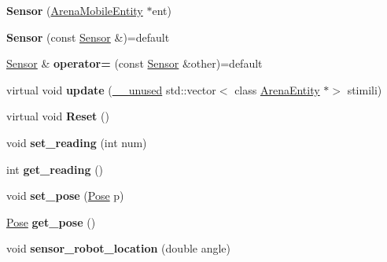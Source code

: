 \begin{DoxyCompactItemize}
\item 
\mbox{\label{class_sensor_a13c4b3a00db6e21e2ac33647440fdc37}} 
{\bfseries Sensor} (\mbox{\hyperlink{class_arena_mobile_entity}{Arena\+Mobile\+Entity}} $\ast$ent)
\item 
\mbox{\label{class_sensor_ac1d81bc5c639eeafed38d69e40dc07b8}} 
{\bfseries Sensor} (const \mbox{\hyperlink{class_sensor}{Sensor}} \&)=default
\item 
\mbox{\label{class_sensor_a48b21cd29fa3f183a2fb9e6447de2219}} 
\mbox{\hyperlink{class_sensor}{Sensor}} \& {\bfseries operator=} (const \mbox{\hyperlink{class_sensor}{Sensor}} \&other)=default
\item 
\mbox{\label{class_sensor_a2e4e8e8e56d307f83550cc04896d2518}} 
virtual void {\bfseries update} (\mbox{\hyperlink{common_8h_a2e3484535ee610c8e19e9859563abe48}{\+\_\+\+\_\+unused}} std\+::vector$<$ class \mbox{\hyperlink{class_arena_entity}{Arena\+Entity}} $\ast$$>$ stimili)
\item 
\mbox{\label{class_sensor_a5e6ad1aa7b2c48e59851e03404dacbde}} 
virtual void {\bfseries Reset} ()
\item 
\mbox{\label{class_sensor_a3ee42616cfe5e55c1efa2a4fd6761a44}} 
void {\bfseries set\+\_\+reading} (int num)
\item 
\mbox{\label{class_sensor_ae574c5b7e58bdbbc47c0d83a7561fa19}} 
int {\bfseries get\+\_\+reading} ()
\item 
\mbox{\label{class_sensor_a877b65abc60821f62fe16771923fba38}} 
void {\bfseries set\+\_\+pose} (\mbox{\hyperlink{struct_pose}{Pose}} p)
\item 
\mbox{\label{class_sensor_afa533b8d8bb5f3787682ffc5ab8c989c}} 
\mbox{\hyperlink{struct_pose}{Pose}} {\bfseries get\+\_\+pose} ()
\item 
\mbox{\label{class_sensor_a97e17a4d4b5fb30bf81d4ad6ee363715}} 
void {\bfseries sensor\+\_\+robot\+\_\+location} (double angle)
$$
\end{DoxyCompactItemize}
